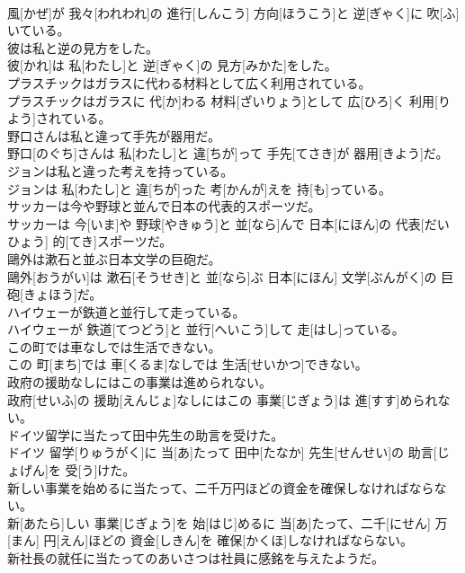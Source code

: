\documentclass[8pt]{extreport}
\begin{document}
\begin{CJK}{UTF8}{min}
\\	風[かぜ]が 我々[われわれ]の 進行[しんこう] 方向[ほうこう]と 逆[ぎゃく]に 吹[ふ]いている。
\\	彼は私と逆の見方をした。	
\\	彼[かれ]は 私[わたし]と 逆[ぎゃく]の 見方[みかた]をした。
\\	プラスチックはガラスに代わる材料として広く利用されている。	
\\	プラスチックはガラスに 代[か]わる 材料[ざいりょう]として 広[ひろ]く 利用[りよう]されている。
\\	野口さんは私と違って手先が器用だ。	
\\	野口[のぐち]さんは 私[わたし]と 違[ちが]って 手先[てさき]が 器用[きよう]だ。
\\	ジョンは私と違った考えを持っている。	
\\	ジョンは 私[わたし]と 違[ちが]った 考[かんが]えを 持[も]っている。
\\	サッカーは今や野球と並んで日本の代表的スポーツだ。	
\\	サッカーは 今[いま]や 野球[やきゅう]と 並[なら]んで 日本[にほん]の 代表[だいひょう] 的[てき]スポーツだ。
\\	鷗外は漱石と並ぶ日本文学の巨砲だ。	
\\	鷗外[おうがい]は 漱石[そうせき]と 並[なら]ぶ 日本[にほん] 文学[ぶんがく]の 巨砲[きょほう]だ。
\\	ハイウェーが鉄道と並行して走っている。	
\\	ハイウェーが 鉄道[てつどう]と 並行[へいこう]して 走[はし]っている。
\\	この町では車なしでは生活できない。	
\\	この 町[まち]では 車[くるま]なしでは 生活[せいかつ]できない。
\\	政府の援助なしにはこの事業は進められない。	
\\	政府[せいふ]の 援助[えんじょ]なしにはこの 事業[じぎょう]は 進[すす]められない。
\\	ドイツ留学に当たって田中先生の助言を受けた。	
\\	ドイツ 留学[りゅうがく]に 当[あ]たって 田中[たなか] 先生[せんせい]の 助言[じょげん]を 受[う]けた。
\\	新しい事業を始めるに当たって、二千万円ほどの資金を確保しなければならない。	
\\	新[あたら]しい 事業[じぎょう]を 始[はじ]めるに 当[あ]たって、二千[にせん] 万[まん] 円[えん]ほどの 資金[しきん]を 確保[かくほ]しなければならない。
\\	新社長の就任に当たってのあいさつは社員に感銘を与えたようだ。	

\end{CJK}
\end{document}
